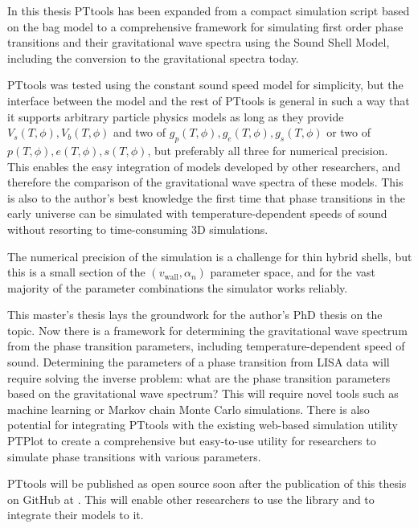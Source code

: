 \iffalse
\begin{itemize}
    \item Briefly discuss the results
    \item Highlight alternative research questions
    \item Put the work in context
    \item etc.
\end{itemize}

"A good thesis should bite itself in the tail"
\fi

In this thesis PTtools has been expanded from a compact simulation script based on the bag model
to a comprehensive framework for simulating first order phase transitions and their gravitational wave spectra using the Sound Shell Model,
including the conversion to the gravitational spectra today.

PTtools was tested using the constant sound speed model for simplicity,
but the interface between the model and the rest of PTtools is general in such a way
that it supports arbitrary particle physics models as long as they provide $V_s(T,\phi), V_b(T,\phi)$ and two of $g_p(T,\phi), g_e(T,\phi), g_s(T,\phi)$ or two of $p(T,\phi), e(T,\phi), s(T,\phi)$, but preferably all three for numerical precision.
This enables the easy integration of models developed by other researchers,
and therefore the comparison of the gravitational wave spectra of these models.
This is also to the author's best knowledge the first time that phase transitions in the early universe can be simulated with temperature-dependent speeds of sound without resorting to time-consuming 3D simulations.

The numerical precision of the simulation is a challenge for thin hybrid shells,
but this is a small section of the $(v_\text{wall}, \alpha_n)$ parameter space,
and for the vast majority of the parameter combinations the simulator works reliably.

This master's thesis lays the groundwork for the author's PhD thesis on the topic.
Now there is a framework for determining the gravitational wave spectrum from the phase transition parameters, including temperature-dependent speed of sound.
Determining the parameters of a phase transition from LISA data will require solving the inverse problem: what are the phase transition parameters based on the gravitational wave spectrum?
This will require novel tools such as machine learning or Markov chain Monte Carlo simulations.
There is also potential for integrating PTtools with the existing web-based simulation utility PTPlot to create a comprehensive but easy-to-use utility for researchers to simulate phase transitions with various parameters.

PTtools will be published as open source soon after the publication of this thesis on GitHub at \cite{pttools}.
This will enable other researchers to use the library and to integrate their models to it.
